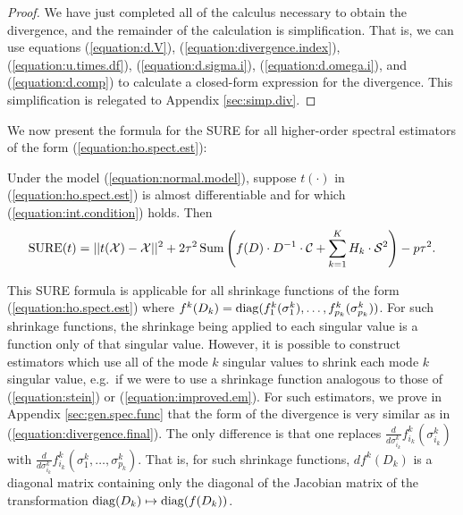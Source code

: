 \begin{proof}
  We have just completed all of the calculus necessary to obtain the
  divergence, and the remainder of the calculation is
  simplification. That is, we can use equations (\ref{equation:d.V}),
  (\ref{equation:divergence.index}), (\ref{equation:u.times.df}),
  (\ref{equation:d.sigma.i}), (\ref{equation:d.omega.i}), and
  (\ref{equation:d.comp}) to calculate a closed-form expression for
  the divergence. This simplification is relegated to Appendix
  \ref{sec:simp.div}.
\end{proof}



We now present the formula for the SURE for all higher-order spectral
estimators of the form (\ref{equation:ho.spect.est}):
\begin{theorem}
  Under the model (\ref{equation:normal.model}), suppose $t(\cdot)$ in
  (\ref{equation:ho.spect.est}) is almost differentiable and for which
  (\ref{equation:int.condition}) holds. Then
  \begin{align}
    \operatorname*{SURE}(t) =  ||t(\mathcal{X}) - \mathcal{X}||^2 + 2\tau^2\operatorname*{Sum}\left(f(D) \cdot D^{-1}\cdot \mathcal{C} + \sum_{k=1}^KH_k \cdot \mathcal{S}^2\right) - p\tau^2. \label{equation:complete.sure}
  \end{align}
\end{theorem}

This SURE formula is applicable for all shrinkage functions of the
form (\ref{equation:ho.spect.est}) where $f^k(D_k) =
\operatorname*{diag}(f_1^k(\sigma_1^k),\ldots,f_{p_k}^k(\sigma_{p_k}^k))$. For such
shrinkage functions, the shrinkage being applied to each singular
value is a function only of that singular value. However, it is
possible to construct estimators which use all of the mode $k$
singular values to shrink each mode $k$ singular value, e.g.\ if we
were to use a shrinkage function analogous to those of
(\ref{equation:stein}) or (\ref{equation:improved.em}). For such
estimators, we prove in Appendix \ref{sec:gen.spec.func} that the form
of the divergence is very similar as in
(\ref{equation:divergence.final}). The only difference is that one
replaces $\frac{d}{d\sigma_{i_k}^k}f_{i_k}^k(\sigma_{i_k}^k)$ with
$\frac{d}{d\sigma_{i_k}^k}f_{i_k}^k(\sigma_{1}^k,\ldots,\sigma_{p_k}^k)$. That
is, for such shrinkage functions, $df^k(D_k)$ is a diagonal matrix
containing only the diagonal of the Jacobian matrix of the
transformation $\operatorname*{diag}(D_k) \mapsto \operatorname*{diag}(f(D_k))$.
